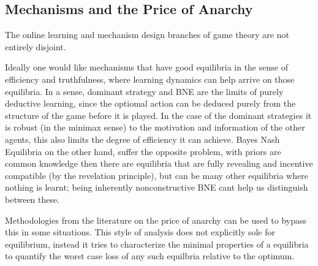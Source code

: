 \subsection{Mechanisms and the Price of Anarchy}

The online learning and mechanism design branches of game theory are not entirely disjoint. 

Ideally one would like mechanisms that have good equilibria in the sense of efficiency and truthfulness, where learning dynamics can help arrive on those equilibria. 
In a sense, dominant strategy and BNE are the limits of purely deductive learning, since the optiomal action can be deduced purely from the structure of the game before it is played. 
In the case of the dominant strategies it is robust (in the minimax sense) to the motivation and information of the other agents, this also limits the degree of efficiency it can achieve. 
Bayes Nash Equilibria on the other hand, suffer the opposite problem, with priors are common knowledge then there are equilibria that are fully revealing and incentive compatible (by the revelation principle), but can be many other equilibria where nothing is learnt; being inherently nonconstructive BNE cant help us distinguish between these. 


Methodologies from the literature on  the price of anarchy can be used to bypass this in some situations.
This style of analysis does not explicitly sole for equilibrium, instead it tries to characterize the minimal properties of a equilibria to quantify the worst case loss of any such equilbria relative to the optimum.

